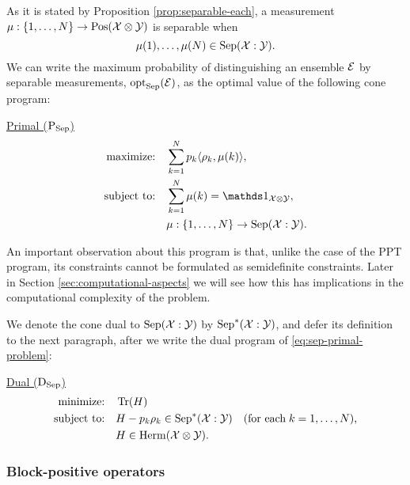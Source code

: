 As it is stated by Proposition \ref{prop:separable-each}, a measurement
$\mu : \{1,\ldots,N\} \rightarrow \mathrm{Pos}(\mathcal{X}\otimes\mathcal{Y})$ is separable when 
\begin{equation}
  \mu(1), \ldots, \mu(N) \in \mathrm{Sep}(\mathcal{X}:\mathcal{Y}).
\end{equation}
We can write the maximum probability of distinguishing an ensemble $\mathcal{E}$ by 
separable measurements, $\operatorname{opt}_{\mathrm{Sep}}(\mathcal{E})$, as the optimal value of the 
following cone program: 
\begin{center}
\underline{Primal ($\textup{P}_{\mathrm{Sep}}$)}
\begin{equation}
  \label{eq:sep-primal-problem}
  \begin{split}
    \text{maximize:} \quad & 
      \sum_{k=1}^{N} p_{k}\ip{\rho_{k}}{\mu(k)},\\
    \text{subject to:} \quad & \sum_{k=1}^{N} \mu(k) = \I_{\X\otimes\Y},\\
        & \mu : \{1,\ldots, N\}\rightarrow \Sep(\X:\Y).
  \end{split}
\end{equation}
\end{center}

An important observation about this program is that, unlike the case of the 
PPT program, its constraints cannot be formulated as semidefinite constraints.
Later in Section \ref{sec:computational-aspects} we will see how this has 
implications in the computational complexity of the problem.

We denote the cone dual to $\mathrm{Sep}(\mathcal{X}:\mathcal{Y})$ by $\mathrm{Sep}^{\ast}(\mathcal{X}:\mathcal{Y})$, and defer its definition
to the next paragraph, after we write the dual program of \eqref{eq:sep-primal-problem}:
\begin{center}
\underline{Dual ($\textup{D}_{\mathrm{Sep}}$)}
\begin{equation}
  \label{eq:sep-dual-problem}
  \begin{split}
    \text{minimize:} \quad & \operatorname{Tr}(H)\\
    \text{subject to:} \quad & H-p_k\rho_k\in\mathrm{Sep}^{\ast}(\mathcal{X}:\mathcal{Y})
    \quad(\text{for each}\;k = 1,\ldots,N),\\
    \quad & H \in \mathrm{Herm}(\mathcal{X}\otimes\mathcal{Y}).
  \end{split}
\end{equation}
\end{center}

\subsubsection{Block-positive operators}
\label{sec:block-positive-operators}

